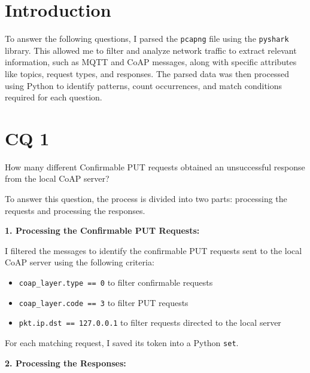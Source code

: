 \documentclass{Configuration_Files/PoliMi3i_thesis}
\begin{document}
\mainmatter %


\chapter{Introduction}
To answer the following questions, I parsed the \texttt{pcapng} file using the \texttt{pyshark} library. This allowed me to filter and analyze network traffic to extract relevant information, such as MQTT and CoAP messages, along with specific attributes like topics, request types, and responses. The parsed data was then processed using Python to identify patterns, count occurrences, and match conditions required for each question.

\chapter{CQ 1}
\begin{tcolorbox}[questionbox]
    How many different Confirmable PUT requests obtained an unsuccessful response from the local CoAP server?
\end{tcolorbox}

To answer this question, the process is divided into two parts: processing the requests and processing the responses.

\textbf{1. Processing the Confirmable PUT Requests:}

I filtered the messages to identify the confirmable PUT requests sent to the local CoAP server using the following criteria:
\begin{itemize}
  \item \texttt{coap\_layer.type == 0} to filter confirmable requests
  \item \texttt{coap\_layer.code == 3} to filter PUT requests
  \item \texttt{pkt.ip.dst == 127.0.0.1} to filter requests directed to the local server
\end{itemize}

For each matching request, I saved its token into a Python \texttt{set}.

\textbf{2. Processing the Responses:}
\end{document}
